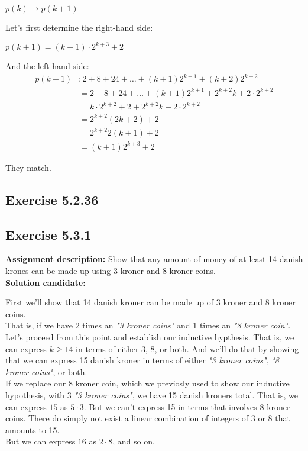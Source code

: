 \documentclass{report}
\newcommand{\cent}[1]{\begin{center}#1\end{center}}
\newcommand{\mAlign}[1]{\begin{align*}#1\end{align*}}
\newcommand{\AssignmentDescription}{\textbf{Assignment description: }}
\newcommand{\Solution}{\textbf{Solution candidate: }}
\newcommand{\QED}{\boxed{}}
\newcommand{\Exercise}[1]{\subsection{Exercise #1}}
\begin{document}
 	\cent{$p(k) \to p(k+1) $}
 	
 	Let's first determine the right-hand side:
 	
 	\cent{$p(k+1) = (k+1) \cdot 2^{k+3}+2$}
 	
 	And the left-hand side:
 	\mAlign{
 		p(k+1) &: 2 + 8 + 24 + \dots + (k+1) 2^{k+1} + (k+2) 2^{k+2} \\
 		&= 2 + 8 + 24 + \dots + (k+1) 2^{k+1} + 2^{k+2}k + 2 \cdot 2^{k+2} \\
 		&= k \cdot 2^{k+2} + 2 + 2^{k+2}k + 2 \cdot 2^{k+2} \\
 		&=  2^{k+2} (2k + 2) + 2 \\
 		&= 2^{k+2}2 (k + 1) + 2 \\
 		&= (k + 1) 2^{k+3} + 2
 	} 
 	
 	They match.\\
 	
 	\QED
 	
 	\Exercise{5.2.36}
 	
 	\Exercise{5.3.1}
 	
 	\AssignmentDescription
 	Show that any amount of money of at least 14 danish krones can be made up using 3 kroner  and 8 kroner coins.\\
 	
 	\Solution
 	
 	First we'll show that 14 danish kroner can be made up of 3 kroner and 8 kroner coins.\\
 	
 	That is, if we have 2 times an \textit{"3 kroner coins"} and 1 times an \textit{"8 kroner coin"}.\\
 	
 	Let's proceed from this point and establish our inductive hypthesis. That is, we can express $k\geq 14$ in terms of either $3$, $8$, or both. And we'll do that by showing that we can express 15 danish kroner in terms of either \textit{"3 kroner coins"}, \textit{"8 kroner coins"}, or both.\\
 	
 	If we replace our 8 kroner coin, which we previosly used to show our inductive hypothesis, with 3 \textit{"3 kroner coins"}, we have 15 danish kroners total. That is, we can express $15$ as $5 \cdot 3$. But we can't express 15 in terms that involves  8 kroner coins. There do simply not exist a linear combination of integers of 3 or 8 that amounts to 15. \\
 	
 	But we can express $16$ as $2 \cdot 8$, and so on.\\
 	
\end{document}

